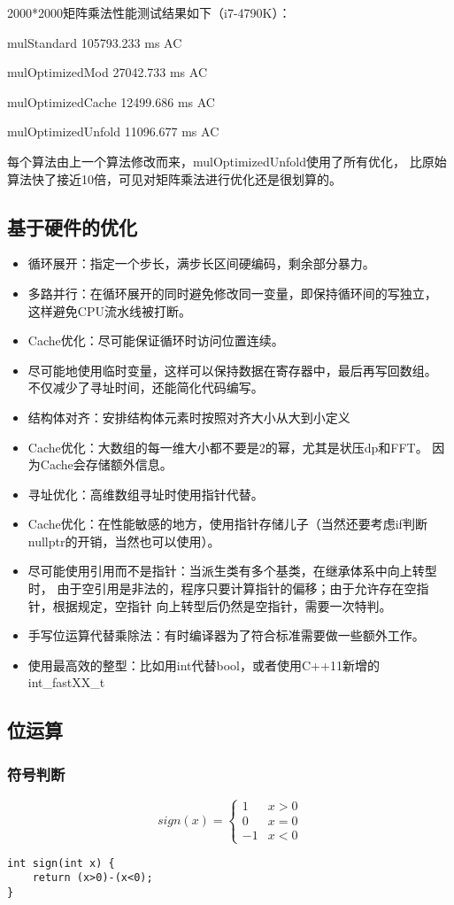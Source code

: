 2000*2000矩阵乘法性能测试结果如下（i7-4790K）：

mulStandard 105793.233 ms AC

mulOptimizedMod 27042.733 ms AC

mulOptimizedCache 12499.686 ms AC

mulOptimizedUnfold 11096.677 ms AC

每个算法由上一个算法修改而来，mulOptimizedUnfold使用了所有优化，
比原始算法快了接近10倍，可见对矩阵乘法进行优化还是很划算的。
\subsection{基于硬件的优化}
\begin{itemize}
    \item 循环展开：指定一个步长，满步长区间硬编码，剩余部分暴力。
    \item 多路并行：在循环展开的同时避免修改同一变量，即保持循环间的写独立，
    这样避免CPU流水线被打断。
    \item Cache优化：尽可能保证循环时访问位置连续。
    \item 尽可能地使用临时变量，这样可以保持数据在寄存器中，最后再写回数组。
    不仅减少了寻址时间，还能简化代码编写。
    \item 结构体对齐：安排结构体元素时按照对齐大小从大到小定义
    \item Cache优化：大数组的每一维大小都不要是2的幂，尤其是状压dp和FFT。
    因为Cache会存储额外信息。
    \item 寻址优化：高维数组寻址时使用指针代替。
    \item Cache优化：在性能敏感的地方，使用指针存储儿子（当然还要考虑if判断
    nullptr的开销，当然也可以使用）。
    \item 尽可能使用引用而不是指针：当派生类有多个基类，在继承体系中向上转型时，
    由于空引用是非法的，程序只要计算指针的偏移；由于允许存在空指针，根据规定，空指针
    向上转型后仍然是空指针，需要一次特判。
    \item 手写位运算代替乘除法：有时编译器为了符合标准需要做一些额外工作。
    \item 使用最高效的整型：比如用int代替bool，或者使用C++11新增的int\_fastXX\_t
\end{itemize}
\subsection{位运算}\label{Bitwise}
\subsubsection{符号判断}
\begin{displaymath}
    sign(x)=\left\{\begin{array}{cc}
        1&x>0\\
        0&x=0\\
        -1&x<0
    \end{array}\right.
\end{displaymath}
\begin{lstlisting}
int sign(int x) {
    return (x>0)-(x<0);
}
\end{lstlisting}

